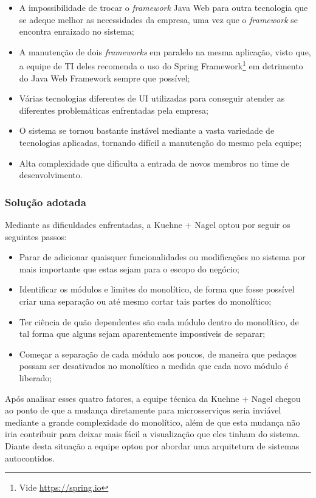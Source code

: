 \begin{itemize}
    \item A impossibilidade de trocar o \textit{framework} Java Web para outra tecnologia que se
        adeque melhor as necessidades da empresa, uma vez que o \textit{framework} se encontra enraizado no sistema;
    \item A manutenção de dois \textit{frameworks} em paralelo na mesma aplicação, visto que, a
    equipe de \gls{TI} deles recomenda o uso do Spring Framework\footnote{Vide \url{https://spring.io}} em
    detrimento do Java Web Framework sempre que possível;
    \item Várias tecnologias diferentes de \gls{UI} utilizadas para conseguir atender as diferentes
    problemáticas enfrentadas pela empresa;
    \item O sistema se tornou bastante instável mediante a vasta variedade de tecnologias aplicadas,
    tornando difícil a manutenção do mesmo pela equipe;
    \item Alta complexidade que dificulta a entrada de novos membros no time de desenvolvimento.
\end{itemize}

\subsubsection{Solução adotada}

Mediante as dificuldades enfrentadas, a Kuehne + Nagel optou por seguir os seguintes passos:

\begin{itemize}
    \item Parar de adicionar quaisquer funcionalidades ou modificações no sistema por mais
        importante que estas sejam para o escopo do negócio;
    \item Identificar os módulos e limites do monolítico, de forma que fosse possível criar uma
        separação ou até mesmo cortar tais partes do monolítico;
    \item Ter ciência de quão dependentes são cada módulo dentro do monolítico, de tal forma que
        alguns sejam aparentemente impossíveis de separar;
    \item Começar a separação de cada módulo aos poucos, de maneira que pedaços possam ser
        desativados no monolítico a medida que cada novo módulo é liberado;
\end{itemize}

Após analisar esses quatro fatores, a equipe técnica da Kuehne + Nagel chegou ao ponto de que a
mudança diretamente para microsserviços seria inviável mediante a grande complexidade do monolítico,
além de que esta mudança não iria contribuir para deixar mais fácil a visualização que eles
tinham do sistema. Diante desta situação a equipe optou por abordar uma arquitetura de sistemas
autocontidos.

